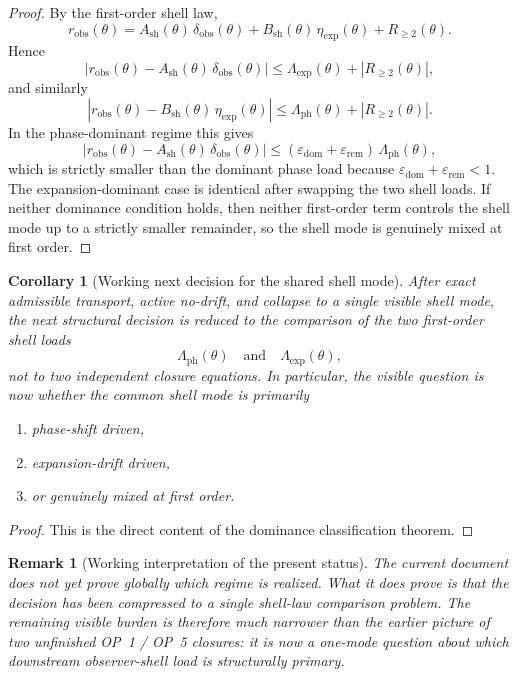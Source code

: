 \documentclass[12pt,a4paper]{article}
\newtheorem{corollary}[theorem]{Corollary}
\newtheorem{remark}[theorem]{Remark}
\begin{document}
\begin{proof}
By the first-order shell law,
\[
 r_{\mathrm{obs}}(\theta)
 =A_{\mathrm{sh}}(\theta)\,\delta_{\mathrm{obs}}(\theta)
 +B_{\mathrm{sh}}(\theta)\,\eta_{\mathrm{exp}}(\theta)
 +R_{\ge 2}(\theta).
\]
Hence
\[
 |r_{\mathrm{obs}}(\theta)-A_{\mathrm{sh}}(\theta)\,\delta_{\mathrm{obs}}(\theta)|
 \le \Lambda_{\mathrm{exp}}(\theta)+|R_{\ge 2}(\theta)|,
\]
and similarly
\[
 |r_{\mathrm{obs}}(\theta)-B_{\mathrm{sh}}(\theta)\,\eta_{\mathrm{exp}}(\theta)|
 \le \Lambda_{\mathrm{ph}}(\theta)+|R_{\ge 2}(\theta)|.
\]
In the phase-dominant regime this gives
\[
 |r_{\mathrm{obs}}(\theta)-A_{\mathrm{sh}}(\theta)\,\delta_{\mathrm{obs}}(\theta)|
 \le (\varepsilon_{\mathrm{dom}}+\varepsilon_{\mathrm{rem}})\,\Lambda_{\mathrm{ph}}(\theta),
\]
which is strictly smaller than the dominant phase load because $\varepsilon_{\mathrm{dom}}+\varepsilon_{\mathrm{rem}}<1$. The expansion-dominant case is identical after swapping the two shell loads. If neither dominance condition holds, then neither first-order term controls the shell mode up to a strictly smaller remainder, so the shell mode is genuinely mixed at first order.
\end{proof}

\begin{corollary}[Working next decision for the shared shell mode]
After exact admissible transport, active no-drift, and collapse to a single visible shell mode, the next structural decision is reduced to the comparison of the two first-order shell loads
\[
 \Lambda_{\mathrm{ph}}(\theta)
 \quad\text{and}\quad
 \Lambda_{\mathrm{exp}}(\theta),
\]
not to two independent closure equations. In particular, the visible question is now whether the common shell mode is primarily
\begin{enumerate}[leftmargin=2em,label=(\roman*)]
\item phase-shift driven,
\item expansion-drift driven,
\item or genuinely mixed at first order.
\end{enumerate}
\end{corollary}

\begin{proof}
This is the direct content of the dominance classification theorem.
\end{proof}

\begin{remark}[Working interpretation of the present status]
The current document does not yet prove globally which regime is realized. What it does prove is that the decision has been compressed to a single shell-law comparison problem. The remaining visible burden is therefore much narrower than the earlier picture of two unfinished OP~1 / OP~5 closures: it is now a one-mode question about which downstream observer-shell load is structurally primary.
\end{remark}
\end{document}
